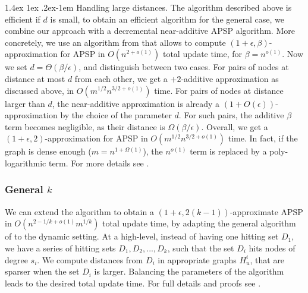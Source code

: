 \documentclass[11pt]{article}
\makeatletter
\theoremstyle{definition}
\theoremstyle{remark}
\newcommand{\sebastian}[1]{\todo[color=green!20]{S: #1}}
\renewcommand{\paragraph}{%
  \@startsection{paragraph}{4}%
  {\z@}{1.4ex \@plus 1ex \@minus .2ex}{-1em}%
  {\normalfont\normalsize\bfseries}%
}
\makeatother
\begin{document}
\paragraph{Handling large distances.} The algorithm described above is efficient if $d$ is small, to obtain an efficient algorithm for the general case, we combine our approach with a decremental near-additive APSP algorithm. More concretely, we use an algorithm from \cite{HKN14} that allows to compute $(1+\epsilon,\beta)$-approximation for APSP in $O(n^{2+o(1)})$ total update time, for $\beta=n^{o(1)}$. Now we set $d=\Theta(\beta/\epsilon)$, and distinguish between two cases. For pairs of nodes at distance at most $d$ from each other, we get a $+2$-additive approximation as discussed above, in $O(m^{1/2}n^{3/2+o(1)})$ time. For pairs of nodes at distance larger than $d$, the near-additive approximation is already a $(1+O(\epsilon))$-approximation by the choice of the parameter $d$. For such pairs, the additive $\beta$ term becomes negligible, as their distance is $\Omega(\beta/\epsilon)$. 
Overall, we get a $(1+\epsilon,2)$-approximation for APSP in $O(m^{1/2}n^{3/2+o(1)})$ time. In fact, if the graph is dense enough ($m=n^{1+\Omega(1)}$), the $n^{o(1)}$ term is replaced by a poly-logarithmic term. For more details see . 

\subsubsection{General \texorpdfstring{$k$}{k}}
We can extend the algorithm to obtain a $(1+\epsilon,2(k-1))$-approximate APSP in $O(n^{2-1/k+o(1)}m^{1/k})$ total update time, by adapting the general algorithm of \cite{DHZ00} to the dynamic setting.
At a high-level, instead of having one hitting set $D_1$, we have a series of hitting sets $D_1,D_2,...,D_k$, such that the set $D_i$ hits nodes of degree $s_i$. We compute distances from $D_i$ in appropriate graphs $H_u^i$, that are sparser when the set $D_i$ is larger. Balancing the parameters of the algorithm leads to the desired total update time. For full details and proofs see .
\end{document}
